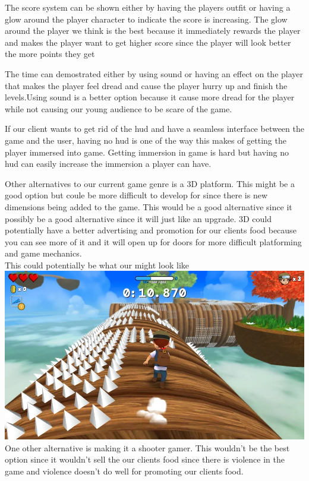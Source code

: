 \documentclass{article}
\begin{document}
The score system can be shown either by having the players outfit or having a glow around the player character to indicate the score is increasing. The glow around the player  we think is the best because it immediately rewards the player and makes the player want to get higher score since the player will look better the more points they get 

The time can demostrated either  by using sound or having an effect on the player that makes the player feel dread and cause the player hurry up and finish the levels.Using sound is a better option because it cause more dread for the player while not causing our young audience to be scare of the game. 

If our client wants to get rid of the hud and have a seamless interface between the game and the user, having no hud is one of the way this makes of getting the player immersed into game. Getting immersion in game is hard but having no hud can easily increase the immersion a player can have.

Other alternatives to our current game genre is a 3D platform. This might be a good option but coule be more difficult to develop for since there is new dimensions being added to the game. This would be a good alternative since it possibly be a good alternative since it will just like an upgrade. 3D could potentially have a better advertising and promotion for our clients food because you can see more of it and it will open up for doors for more difficult platforming and game mechanics. \\

This could potentially be what our might look like \\
\includegraphics[scale=0.25]{M1}\\

One other alternative is making it a shooter gamer. This wouldn't be the best option since it wouldn't sell the our clients food since there is violence in the game and violence doesn't do well for promoting our clients food. 
\end{document}
